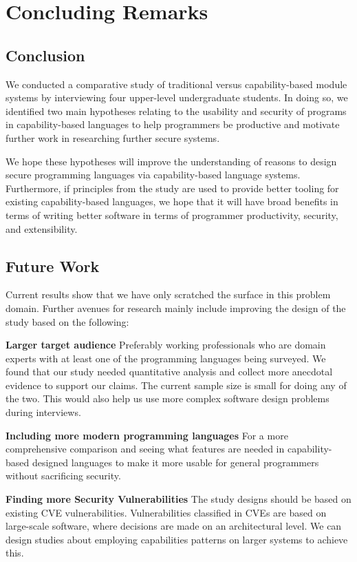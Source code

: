 \section{Concluding Remarks}\label{sec-conclusion}

\subsection{Conclusion}

\noindent
We conducted a comparative study of traditional versus capability-based module systems by interviewing four upper-level undergraduate students. In doing so, we identified two main hypotheses relating to the usability and security of programs in capability-based languages to help programmers be productive and motivate further work in researching further secure systems. %

We hope these hypotheses will improve the understanding of reasons to design secure programming languages via capability-based language systems. Furthermore, if principles from the study are used to provide better tooling for existing capability-based languages, we hope that it will have broad benefits in terms of writing better software in terms of programmer productivity, security, and extensibility.

\subsection{Future Work}

\noindent
Current results show that we have only scratched the surface in this problem domain. Further avenues for research mainly include improving the design of the study based on the following:

\noindent
\textbf{Larger target audience} Preferably working professionals who are domain experts with at least one of the programming languages being surveyed. We found that our study needed quantitative analysis and collect more anecdotal evidence to support our claims. The current sample size is small for doing any of the two. This would also help us use more complex software design problems during interviews.  

\noindent
\textbf{Including more modern programming languages} For a more comprehensive comparison and seeing what features are needed in capability-based designed languages to make it more usable for general programmers without sacrificing security.

\noindent
\textbf{Finding more Security Vulnerabilities} The study designs should be based on existing CVE vulnerabilities. Vulnerabilities classified in CVEs are based on large-scale software, where decisions are made on an architectural level. We can design studies about employing capabilities patterns on larger systems to achieve this.


